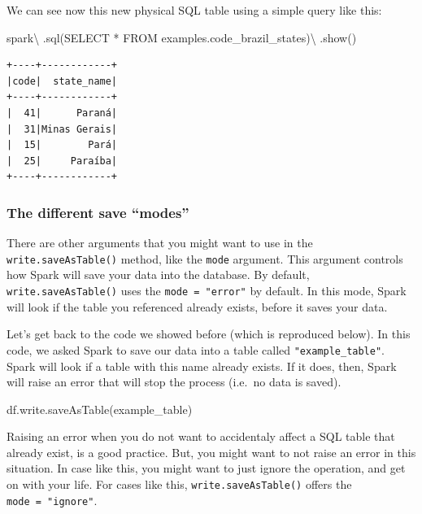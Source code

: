 \documentclass[
  11pt,
  letterpaper,
  DIV=11,
  numbers=noendperiod]{scrreprt}
\newenvironment{Shaded}{\begin{snugshade}}{\end{snugshade}}
\newcommand{\NormalTok}[1]{\textcolor[rgb]{0.00,0.23,0.31}{#1}}
\newcommand{\OperatorTok}[1]{\textcolor[rgb]{0.37,0.37,0.37}{#1}}
\newcommand{\StringTok}[1]{\textcolor[rgb]{0.13,0.47,0.30}{#1}}
\begin{document}
We can see now this new physical SQL table using a simple query like
this:

\begin{Shaded}
\begin{Highlighting}[]
\NormalTok{spark}\OperatorTok{\textbackslash{}}
\NormalTok{  .sql(}\StringTok{\textquotesingle{}SELECT * FROM examples.code\_brazil\_states\textquotesingle{}}\NormalTok{)}\OperatorTok{\textbackslash{}}
\NormalTok{  .show()}
\end{Highlighting}
\end{Shaded}

\begin{verbatim}
+----+------------+
|code|  state_name|
+----+------------+
|  41|      Paraná|
|  31|Minas Gerais|
|  15|        Pará|
|  25|     Paraíba|
+----+------------+
\end{verbatim}

\hypertarget{the-different-save-modes}{%
\subsubsection{The different save
``modes''}\label{the-different-save-modes}}

There are other arguments that you might want to use in the
\texttt{write.saveAsTable()} method, like the \texttt{mode} argument.
This argument controls how Spark will save your data into the database.
By default, \texttt{write.saveAsTable()} uses the
\texttt{mode\ =\ "error"} by default. In this mode, Spark will look if
the table you referenced already exists, before it saves your data.

Let's get back to the code we showed before (which is reproduced below).
In this code, we asked Spark to save our data into a table called
\texttt{"example\_table"}. Spark will look if a table with this name
already exists. If it does, then, Spark will raise an error that will
stop the process (i.e.~no data is saved).

\begin{Shaded}
\begin{Highlighting}[]
\NormalTok{df.write.saveAsTable(}\StringTok{\textquotesingle{}example\_table\textquotesingle{}}\NormalTok{)}
\end{Highlighting}
\end{Shaded}

Raising an error when you do not want to accidentaly affect a SQL table
that already exist, is a good practice. But, you might want to not raise
an error in this situation. In case like this, you might want to just
ignore the operation, and get on with your life. For cases like this,
\texttt{write.saveAsTable()} offers the \texttt{mode\ =\ "ignore"}.
\end{document}
